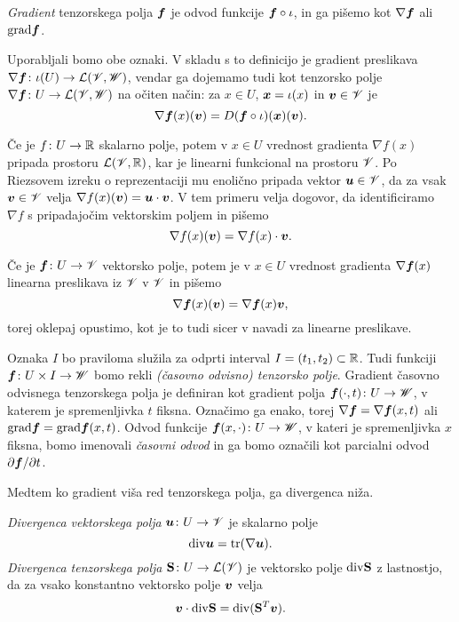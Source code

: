 \begin{definicija}
	\emph{Gradient} tenzorskega polja $\boldsymbol f$ je odvod funkcije $\boldsymbol f\circ\iota$,
	in ga pišemo kot $\nabla\boldsymbol f$ ali $\mathrm{grad}\boldsymbol f$.
\end{definicija}
Uporabljali bomo obe oznaki. V skladu s to definicijo je gradient preslikava
$\nabla\boldsymbol f\colon\iota(U)\to\mathcal L(\mathscr V,\mathscr W)$, vendar ga dojemamo tudi kot tenzorsko polje
$\nabla\boldsymbol f\colon U\to\mathcal L(\mathscr V,\mathscr W)$ na očiten način: za $x\in U$,
$\boldsymbol x=\iota(x)$ in $\boldsymbol v\in\mathscr V$ je
\[
	\nabla\boldsymbol f(x)(\boldsymbol v)=D(\boldsymbol f\circ\iota)(\boldsymbol x)(\boldsymbol v).
\]

Če je $f\colon U\to\mathbb R$ skalarno polje, potem v $x\in U$ vrednost gradienta $\nabla f(x)$
pripada prostoru $\mathcal L(\mathscr V,\mathbb R)$, kar je linearni funkcional na prostoru $\mathscr V$. Po Riezsovem
izreku o reprezentaciji mu enolično pripada vektor $\boldsymbol u\in\mathscr V$, da za vsak
$\boldsymbol v\in\mathscr V$ velja $\nabla f(x)(\boldsymbol v)=\boldsymbol u\cdot\boldsymbol v$. V tem primeru velja
dogovor, da identificiramo $\nabla f$ s pripadajočim vektorskim poljem in pišemo
\[ \nabla f(x)(\boldsymbol v)=\nabla f(x)\cdot\boldsymbol v. \]

Če je $\boldsymbol f\colon U\to\mathscr V$ vektorsko polje, potem je v $x\in U$ vrednost gradienta $\nabla\boldsymbol f(x)$
linearna preslikava iz $\mathscr V$ v $\mathscr V$ in pišemo
\[ \nabla\boldsymbol f(x)(\boldsymbol v)=\nabla\boldsymbol f(x)\boldsymbol v, \]
torej oklepaj opustimo, kot je to tudi sicer v navadi za linearne preslikave.

Oznaka $I$ bo praviloma služila za odprti interval $I=(t_1,t_2)\subset\mathbb R$. Tudi funkciji
$\boldsymbol f\colon U\times I\to\mathscr W$ bomo rekli \emph{(časovno odvisno) tenzorsko polje}.
Gradient časovno odvisnega tenzorskega polja je definiran kot gradient polja
$\boldsymbol f(\cdot,t)\colon U\to\mathscr W$, v katerem je spremenljivka $t$ fiksna. Označimo
ga enako, torej $\nabla\boldsymbol f=\nabla\boldsymbol f(x,t)$ ali $\mathrm{grad}\boldsymbol f=\mathrm{grad}\boldsymbol f(x,t)$.
Odvod funkcije $\boldsymbol f(x,\cdot)\colon U\to\mathscr W$, v kateri je spremenljivka $x$ fiksna,
bomo imenovali \emph{časovni odvod} in ga bomo označili kot parcialni odvod
$\partial\boldsymbol f/\partial t$.

Medtem ko gradient viša red tenzorskega polja, ga divergenca niža.
\begin{definicija}
	\emph{Divergenca vektorskega polja} $\boldsymbol u\colon U\to\mathscr V$ je skalarno polje
	\begin{equation} \label{e:div1}
		\mathrm{div}\boldsymbol u=\mathrm{tr}(\nabla\boldsymbol u).
	\end{equation}
	\emph{Divergenca tenzorskega polja} $\mathbf S\colon U\to\mathcal L(\mathscr V)$ je vektorsko polje $\mathrm{div}\mathbf S$ z lastnostjo,
	da za vsako konstantno vektorsko polje $\boldsymbol v$ velja
	\begin{equation} \label{e:div2}
		\boldsymbol v\cdot\mathrm{div}\mathbf S = \mathrm{div}(\mathbf S^{T}\boldsymbol v).
	\end{equation}
\end{definicija}

